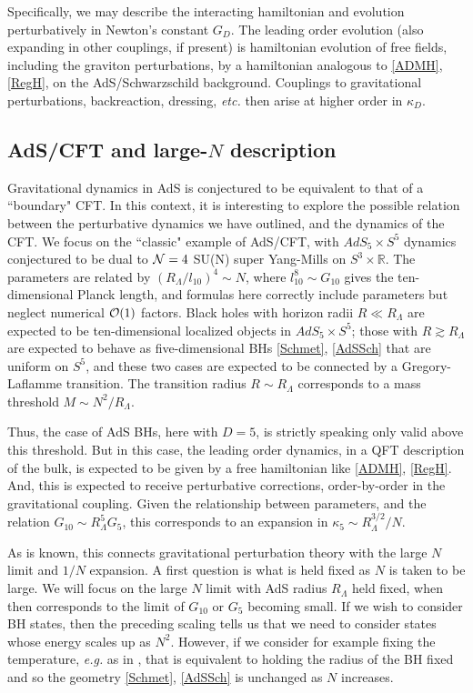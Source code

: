 \documentclass[12pt]{article}
\numberwithin{equation}{section}
\newcommand{\calo}{{\cal O}}
\begin{document}
Specifically, we may describe the interacting hamiltonian and evolution perturbatively in Newton's constant $G_D$.  The leading order evolution (also expanding in other couplings, if present) is hamiltonian evolution of free fields, including the graviton perturbations, by a hamiltonian analogous to \eqref{ADMH},  \eqref{RegH}, on the AdS/Schwarzschild background.  Couplings to gravitational perturbations, backreaction, dressing, {\it etc.} then arise at higher order in $\kappa_D$.

\subsection{AdS/CFT and large-$N$ description}

Gravitational dynamics in AdS is conjectured to be equivalent to that of a ``boundary"  CFT\cite{Mald}.  In this context, it is interesting to explore the possible relation between the perturbative dynamics we have outlined, and the dynamics of the CFT.  We focus on the ``classic" example of AdS/CFT, with $AdS_5\times S^5$ dynamics conjectured to be dual to ${\cal N}=4$ SU(N) super Yang-Mills on $S^3\times \mathbb{R}$.  The parameters are related by $(R_\Lambda/l_{10})^4 \sim  N$, where  $l_{10}^8 \sim G_{10}$ gives the ten-dimensional Planck length, and formulas here correctly include parameters but neglect numerical $\calo(1)$ factors.  Black holes with horizon radii $R\ll R_\Lambda$ are expected to be ten-dimensional localized objects in $AdS_5\times S^5$; those with $R\gtrsim R_\Lambda$ are expected to behave as five-dimensional BHs \eqref{Schmet}, \eqref{AdSSch} that are uniform on $S^5$, and these two cases are expected to be connected by a Gregory-Laflamme transition\cite{GrLa}.  The transition radius $R\sim R_\Lambda$ corresponds to a mass threshold $M\sim N^2/R_\Lambda$.  

Thus, the case of AdS BHs, here with $D=5$, is strictly speaking only valid above this threshold.  But in this case, the leading order dynamics, in a QFT description of the bulk, is expected to be given by a free hamiltonian like \eqref{ADMH},  \eqref{RegH}.  And, this is expected to receive perturbative corrections, order-by-order in the gravitational coupling.  Given the relationship between parameters, and the relation $G_{10}\sim R_\Lambda^5 G_5$, this corresponds to an expansion in $\kappa_5\sim R^{3/2}_\Lambda/N$.  

As is known, this connects gravitational perturbation theory with the large $N$ limit and $1/N$ expansion.  A first question is what is held fixed as $N$ is taken to be large.  We will focus on the large $N$ limit with AdS radius $R_\Lambda$ held fixed, when then corresponds to the limit of $G_{10}$ or $G_5$ becoming small.  If we wish to consider BH states, then the preceding scaling tells us that we need to consider states whose energy scales up as $N^2$.  However, if we consider for example fixing the temperature, {\it e.g.} as in \cite{ScWi}, that is equivalent to holding the radius of the BH fixed and so the geometry  \eqref{Schmet}, \eqref{AdSSch} is unchanged as $N$ increases.
\end{document}
